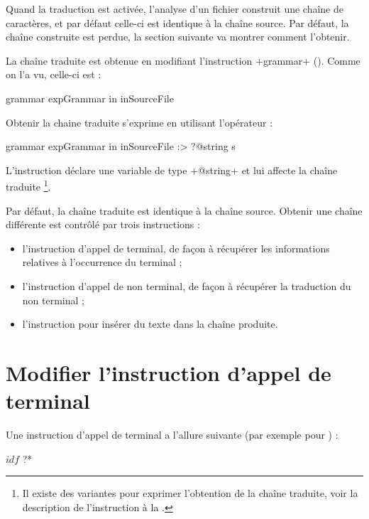 Quand la traduction est activée, l'analyse d'un fichier construit une chaîne de caractères, et par défaut celle-ci est identique à la chaîne source. Par défaut, la chaîne construite est perdue, la section suivante va montrer comment l'obtenir.









La chaîne traduite est obtenue en modifiant l'instruction \ggs+grammar+ (). Comme on l'a vu, celle-ci est : 
\begin{galgascode}
grammar expGrammar in inSourceFile
\end{galgascode}

Obtenir la chaine traduite s'exprime en utilisant l'opérateur  \galgas{\:>} :
\begin{galgascode}
grammar expGrammar in inSourceFile :> ?@string s
\end{galgascode}

L'instruction déclare une variable  de type \ggs+@string+ et lui affecte la chaîne traduite \footnote{Il existe des variantes pour exprimer l'obtention de la chaîne traduite, voir la description de l'instruction  à la .}.

Par défaut, la chaîne traduite est identique à la chaîne source. Obtenir une chaîne différente est contrôlé par trois instructions :
\begin{itemize}
  \item l'instruction d'appel de terminal, de façon à récupérer les informations relatives à l'occurrence du terminal ;
  \item l'instruction d'appel de non terminal, de façon à récupérer la traduction du non terminal ;
  \item l'instruction  pour insérer du texte dans la chaîne produite.
\end{itemize}







\section{Modifier l'instruction d'appel de terminal}

Une instruction d'appel de terminal a l'allure suivante (par exemple pour ) :
\begin{galgascode}
$idf$ ?*
\end{galgascode}

